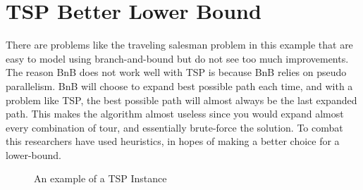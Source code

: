 
\section{TSP Better Lower Bound}
    There are problems like the traveling salesman problem in this example
    that are easy to model using branch-and-bound but do not see too much improvements.
    The reason BnB does not work well with TSP is because BnB relies on pseudo
    parallelism. BnB will choose to expand best possible path each time, and 
    with a problem like TSP, the best possible path will almost always be the 
    last expanded path. This makes the algorithm almost useless since you 
    would expand almost every combination of tour, and essentially brute-force the solution.
    To combat this researchers have used heuristics, in hopes of making a better
    choice for a lower-bound.


    \begin{figure}[h]
        \begin{center}
        \end{center}
        \caption{\doublespacing An example of a TSP Instance}
        \label{fig:lattice}
    \end{figure}

